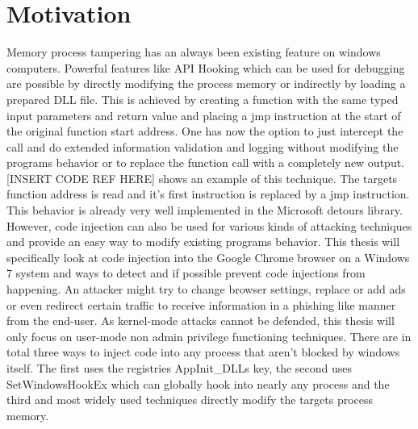 \section{Motivation}
Memory process tampering has an always been existing feature on windows computers. Powerful features like API Hooking which can be used for debugging are possible by directly modifying the process memory or indirectly by loading a prepared DLL file. This is achieved by creating a function with the same typed input parameters and return value and placing a jmp instruction at the start of the original function start address. One has now the option to just intercept the call and do extended information validation and logging without modifying the programs behavior or to replace the function call with a completely new output. [INSERT CODE REF HERE] shows an example of this technique. The targets function address is read and it's first instruction is replaced by a jmp instruction. This behavior is already very well implemented in the Microsoft detours library\cite{msdetours}.
However, code injection can also be used for various kinds of attacking techniques and provide an easy way to modify existing programs behavior. This thesis will specifically look at code injection into the Google Chrome browser on a Windows 7 system and ways to detect and if possible prevent code injections from happening. An attacker might try to change browser settings, replace or add ads or even redirect certain traffic to receive information in a phishing like manner from the end-user. As kernel-mode attacks cannot be defended, this thesis will only focus on user-mode non admin privilege functioning techniques. There are in total three ways to inject code into any process that aren't blocked by windows itself. The first
uses the registries AppInit\_DLLs key, the second uses SetWindowsHookEx which can globally hook into nearly any process and the third and most widely used techniques directly modify the targets process memory.


